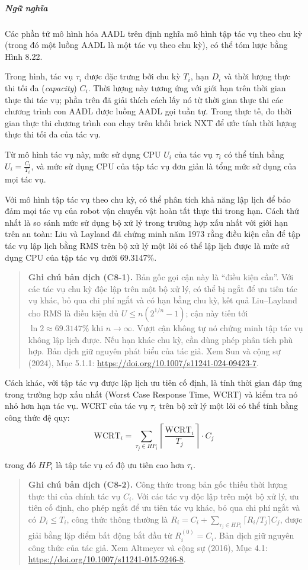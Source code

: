 \subparagraph{Ngữ nghĩa}
Các phần tử mô hình hóa AADL trên định nghĩa mô hình tập tác vụ theo chu kỳ (trong đó một luồng AADL là một tác vụ theo chu kỳ), có thể tóm lược bằng Hình 8.22.

Trong hình, tác vụ $\tau_i$ được đặc trưng bởi chu kỳ $T_i$, hạn $D_i$ và thời lượng thực thi tối đa (\emph{capacity}) $C_i$. Thời lượng này tương ứng với giới hạn trên thời gian thực thi tác vụ; phần trên đã giải thích cách lấy nó từ thời gian thực thi các chương trình con AADL được luồng AADL gọi tuần tự. Trong thực tế, đo thời gian thực thi chương trình con chạy trên khối brick NXT để ước tính thời lượng thực thi tối đa của tác vụ.

Từ mô hình tác vụ này, mức sử dụng CPU $U_i$ của tác vụ $\tau_i$ có thể tính bằng $U_i=\frac{C_i}{T_i}$, và mức sử dụng CPU của tập tác vụ đơn giản là tổng mức sử dụng của mọi tác vụ.

Với mô hình tập tác vụ theo chu kỳ, có thể phân tích khả năng lập lịch để bảo đảm mọi tác vụ của robot vận chuyển vật hoàn tất thực thi trong hạn. Cách thứ nhất là so sánh mức sử dụng bộ xử lý trong trường hợp xấu nhất với giới hạn trên an toàn: Liu và Layland đã chứng minh năm 1973 rằng điều kiện cần để tập tác vụ lập lịch bằng RMS trên bộ xử lý một lõi có thể lập lịch được là mức sử dụng CPU của tập tác vụ dưới 69.3147\%.
\begin{quote}
\small\textbf{Ghi chú bản dịch (C8-1).} Bản gốc gọi cận này là ``điều kiện cần''. Với các tác vụ chu kỳ độc lập trên một bộ xử lý, có thể bị ngắt để ưu tiên tác vụ khác, bỏ qua chi phí ngắt và có hạn bằng chu kỳ, kết quả Liu--Layland cho RMS là điều kiện đủ $U\le n(2^{1/n}-1)$; cận này tiến tới $\ln 2\approx69.3147\%$ khi $n\to\infty$. Vượt cận không tự nó chứng minh tập tác vụ không lập lịch được. Nếu hạn khác chu kỳ, cần dùng phép phân tích phù hợp. Bản dịch giữ nguyên phát biểu của tác giả. Xem Sun và cộng sự (2024), Mục 5.1.1: \url{https://doi.org/10.1007/s11241-024-09423-7}.
\end{quote}

Cách khác, với tập tác vụ được lập lịch ưu tiên cố định, là tính thời gian đáp ứng trong trường hợp xấu nhất (Worst Case Response Time, WCRT) và kiểm tra nó nhỏ hơn hạn tác vụ. WCRT của tác vụ $\tau_i$ trên bộ xử lý một lõi có thể tính bằng công thức đệ quy:
\[
\mathrm{WCRT}_i=\sum_{\tau_j\in HP_i}\left\lceil\frac{\mathrm{WCRT}_i}{T_j}\right\rceil\cdot C_j
\]

trong đó $HP_i$ là tập tác vụ có độ ưu tiên cao hơn $\tau_i$.
\begin{quote}
\small\textbf{Ghi chú bản dịch (C8-2).} Công thức trong bản gốc thiếu thời lượng thực thi của chính tác vụ $C_i$. Với các tác vụ độc lập trên một bộ xử lý, ưu tiên cố định, cho phép ngắt để ưu tiên tác vụ khác, bỏ qua chi phí ngắt và có $D_i\le T_i$, công thức thông thường là $R_i=C_i+\sum_{\tau_j\in HP_i}\lceil R_i/T_j\rceil C_j$, được giải bằng lặp điểm bất động bắt đầu từ $R_i^{(0)}=C_i$. Bản dịch giữ nguyên công thức của tác giả. Xem Altmeyer và cộng sự (2016), Mục 4.1: \url{https://doi.org/10.1007/s11241-015-9246-8}.
\end{quote}


